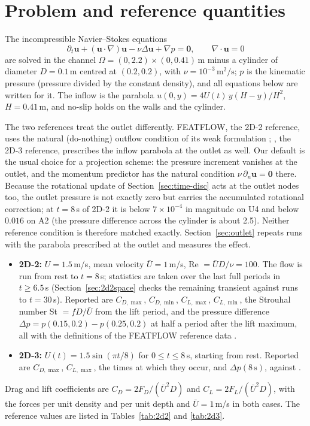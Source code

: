 \documentclass[preprint,12pt,number]{elsarticle}
\newcommand{\Ub}{\bar U}
\newcommand{\bu}{\mathbf{u}}
\begin{document}
\section{Problem and reference quantities}
\label{sec:problem}

The incompressible Navier--Stokes equations
\begin{equation}
\partial_t \bu + (\bu\cdot\nabla)\bu - \nu\Delta\bu + \nabla p = \mathbf{0},\qquad
\nabla\cdot\bu = 0
\label{eq:ns}
\end{equation}
are solved in the channel $\Omega = (0, 2.2)\times(0, 0.41)\,\mathrm{m}$ minus a cylinder of
diameter $D = 0.1\,$m centred at $(0.2, 0.2)$, with $\nu = 10^{-3}\,\mathrm{m^2/s}$;
$p$ is the kinematic pressure (pressure divided by the constant density), and all equations
below are written for it. The inflow is the parabola
$u(0,y) = 4U(t)\,y(H-y)/H^2$, $H = 0.41\,$m, and no-slip holds on the walls and the cylinder.

The two references treat the outlet differently. FEATFLOW, the 2D-2 reference, uses the
natural (do-nothing) outflow condition of its weak formulation \citep{featflow};
\citet{john2004}, the 2D-3 reference, prescribes the inflow parabola at the outlet as well.
Our default is the usual choice for a projection scheme: the pressure increment vanishes at
the outlet, and the momentum predictor has the natural condition
$\nu\,\partial_n\bu = \mathbf{0}$ there. Because the rotational update of
Section~\ref{sec:time-disc} acts at the outlet nodes too, the outlet pressure is not exactly
zero but carries the accumulated rotational correction; at $t = 8\,$s of 2D-2 it is below
$7\times10^{-4}$ in magnitude on U4 and below $0.016$ on A2 (the pressure difference across
the cylinder is about 2.5). Neither reference
condition is therefore matched exactly. Section~\ref{sec:outlet} repeats runs with the parabola
prescribed at the outlet and measures the effect.
\begin{itemize}
\item \textbf{2D-2:} $U = 1.5\,$m/s, mean velocity $\Ub = 1\,$m/s, Re $= \Ub D/\nu = 100$.
  The flow is run from rest to $t = 8\,$s; statistics are taken over the last full periods
  in $t \ge 6.5\,$s (Section~\ref{sec:2d2space} checks the remaining transient against runs to
  $t = 30\,$s). Reported are $C_{D,\max}$, $C_{D,\min}$, $C_{L,\max}$, $C_{L,\min}$, the
  Strouhal number St $= fD/\Ub$ from the lift period, and the pressure difference
  $\Delta p = p(0.15, 0.2) - p(0.25, 0.2)$ at half a period after the lift maximum, all with
  the definitions of the FEATFLOW reference data \citep{featflow}.
\item \textbf{2D-3:} $U(t) = 1.5\sin(\pi t/8)$ for $0 \le t \le 8\,$s, starting from rest.
  Reported are $C_{D,\max}$, $C_{L,\max}$, the times at which they occur, and
  $\Delta p(8\,\mathrm{s})$, against \citet{john2004}.
\end{itemize}
Drag and lift coefficients are $C_{D} = 2F_D/(\Ub^2 D)$ and $C_L = 2F_L/(\Ub^2 D)$, with
the forces per unit density and per unit depth and $\Ub = 1\,$m/s in both cases. The reference values are listed in
Tables~\ref{tab:2d2} and \ref{tab:2d3}.
\end{document}
